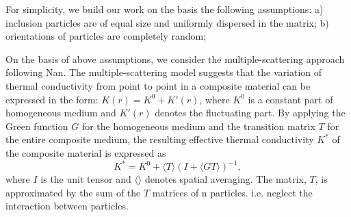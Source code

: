 \documentclass[conference,compsoc]{IEEEtran}
\begin{document}
For simplicity, we build our work on the basis the following assumptions: 
a) inclusion particles are of equal size and uniformly dispersed in the matrix; 
b) orientations of particles are completely random; 


On the basis of above assumptions, we consider the multiple-scattering approach following Nan\cite{1}. The multiple-scattering model suggests that the variation of thermal conductivity from point to point in a composite material can be expressed in the form: $K(r) = K^0+K'(r)$, where $K^0$ is a constant part of homogeneous medium and $K'(r)$ denotes the fluctuating part. By applying the Green function $G$ for the homogeneous medium and the transition matrix $T$ for the entire composite medium, the resulting effective thermal conductivity $K^*$ of the composite material is expressed as
\begin{equation}
\label{orig}
K^* = K^0 + \langle T \rangle (I + \langle G T \rangle)^{-1},
\end{equation}
where $I$ is the unit tensor and $\langle \rangle$ denotes spatial averaging. The matrix, $T$, is approximated by the sum of the $T$ matrices of n particles. i.e. neglect the interaction between particles.  
\end{document}
